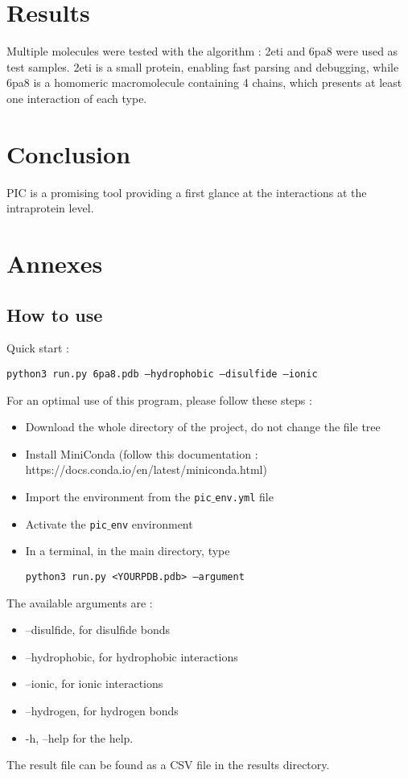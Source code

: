 \documentclass[]{article}
\begin{document}
\section{Results}
Multiple molecules were tested with the algorithm : 2eti and 6pa8 were used as test samples. 2eti is a small protein, enabling fast parsing and debugging, while 6pa8 is a homomeric macromolecule containing 4 chains, which presents at least one interaction of each type.

\section{Conclusion}
PIC is a promising tool providing a first glance at the interactions at the intraprotein level.

\newpage
\section{Annexes}
\subsection{How to use}
Quick start :
\begin{center}\texttt{python3 run.py 6pa8.pdb --hydrophobic --disulfide --ionic}
\end{center}
For an optimal use of this program, please follow these steps :
\begin{itemize}
	\item Download the whole directory of the project, do not change the file tree
	\item Install MiniConda (follow this documentation : https://docs.conda.io/en/latest/miniconda.html)
	\item Import the environment from the \texttt{pic$\_$env.yml} file
	\item Activate the \texttt{pic$\_$env} environment
	\item In a terminal, in the main directory, type
	 \begin{center}\texttt{python3 run.py <YOURPDB.pdb> --argument}
	 \end{center}
  \end{itemize}
 The available arguments are :
 \begin{itemize}
 	\item --disulfide, for disulfide bonds
 	\item --hydrophobic, for hydrophobic interactions
 	\item --ionic, for ionic interactions
 	\item --hydrogen, for hydrogen bonds
 	\item -h, --help for the help.

\end{itemize}
The result file can be found as a CSV file in the results directory.
\end{document}
